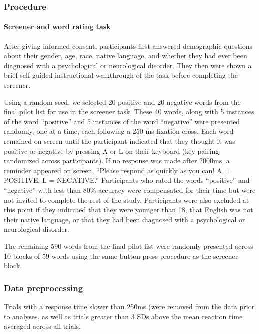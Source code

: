 \documentclass[man]{apa6}
\let\oldparagraph\paragraph
\renewcommand{\paragraph}[1]{\oldparagraph{#1}\mbox{}}
\begin{document}
\hypertarget{procedure}{%
\subsubsection{Procedure}\label{procedure}}

\hypertarget{screener-and-word-rating-task}{%
\paragraph{Screener and word rating task}\label{screener-and-word-rating-task}}

After giving informed consent, participants first answered demographic questions about their gender, age, race, native language, and whether they had ever been diagnosed with a psychological or neurological disorder. They then were shown a brief self-guided instructional walkthrough of the task before completing the screener.

Using a random seed, we selected 20 positive and 20 negative words from the final pilot list for use in the screener task. These 40 words, along with 5 instances of the word \enquote{positive} and 5 instances of the word \enquote{negative} were presented randomly, one at a time, each following a 250 ms fixation cross. Each word remained on screen until the participant indicated that they thought it was positive or negative by pressing A or L on their keyboard (key pairing randomized across participants). If no response was made after 2000ms, a reminder appeared on screen, \enquote{Please respond as quickly as you can! A = POSITIVE. L = NEGATIVE.} Participants who rated the words \enquote{positive} and \enquote{negative} with less than 80\% accuracy were compensated for their time but were not invited to complete the rest of the study. Participants were also excluded at this point if they indicated that they were younger than 18, that English was not their native language, or that they had been diagnosed with a psychological or neurological disorder.

The remaining 590 words from the final pilot list were randomly presented across 10 blocks of 59 words using the same button-press procedure as the screener block.

\hypertarget{data-preprocessing}{%
\subsubsection{Data preprocessing}\label{data-preprocessing}}

Trials with a response time slower than 250ms (were removed from the data prior to analyses, as well as trials greater than 3 SDs above the mean reaction time averaged across all trials.
\end{document}
